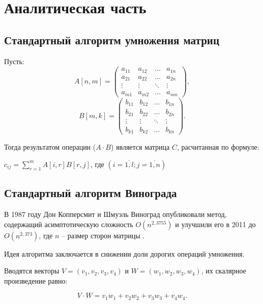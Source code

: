 \chapter{Аналитическая часть}
\section{Стандартный алгоритм умножения матриц}
Пусть:
\begin{equation}
	\label{eq:an_matrixies}
	A[n, m] = \begin{pmatrix}
		a_{11} & a_{12} & \ldots & a_{1n}\\
		a_{21} & a_{22} & \ldots & a_{2n}\\
		\vdots & \vdots & \ddots & \vdots\\
		a_{m1} & a_{m2} & \ldots & a_{mn}
	\end{pmatrix},
\end{equation}
\begin{equation}
	B[m, k] = \begin{pmatrix}
		b_{11} & b_{12} & \ldots & b_{1n}\\
		b_{21} & b_{22} & \ldots & b_{2n}\\
		\vdots & \vdots & \ddots & \vdots\\
		b_{k1} & b_{k2} & \ldots & b_{kn}
	\end{pmatrix}.
\end{equation}

Тогда результатом операции ($A \cdot B$) является матрица $C$, расчитанная по формуле:

\centerline{$c_{ij} = \sum_{r=1}^{m} A[i, r] B[r, j]$, где $(i=\overline{1,l}; j=\overline{1,n})$}

\section{Стандартный алгоритм Винограда}
В 1987 году Дон Копперсмит и Шмуэль Виноград опубликовали метод, содержащий асимптотическую сложность $O(n^{2,3755})$ и улучшили  его в 2011 до $O(n^{2,373})$, где $n$ -- размер сторон матрицы \cite{book_vinograd}.

Идея алгоритма заключается в снижении доли дорогих операций умножения.

Вводятся векторы $V = (v_1, v_2, v_3, v_4)$ и $W = (w_1, w_2, w_3, w_4)$, их скалярное произведение равно:

\begin{equation}
V \cdot W = v_1w_1 + v_2w_2 + v_3w_3 + v_4w_4.
\end{equation}
	

